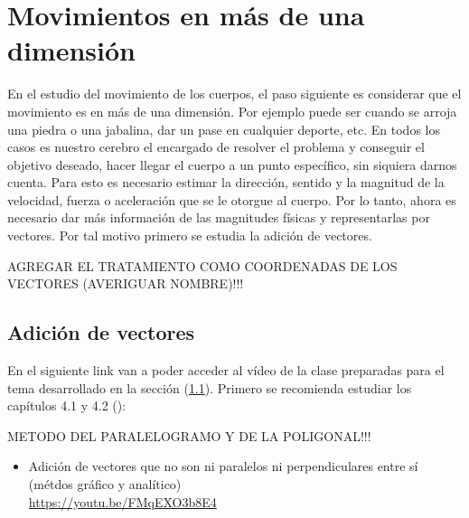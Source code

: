 
\section{Movimientos en más de una dimensión}
\label{c.2d}

En el estudio del movimiento de los cuerpos, el paso siguiente es considerar que
el movimiento es en más de una dimensión. Por ejemplo puede ser cuando se arroja
una piedra o una jabalina, dar un pase en cualquier deporte, etc. En todos los
casos es nuestro cerebro el encargado de resolver el problema y conseguir el
objetivo deseado, hacer llegar el cuerpo a un punto específico, sin siquiera
darnos cuenta. Para esto es necesario estimar la dirección, sentido y la
magnitud de la velocidad, fuerza o aceleración que se le otorgue al cuerpo. Por
lo tanto, ahora es necesario dar más información de las magnitudes físicas y
representarlas por vectores. Por tal motivo primero se estudia la adición de
vectores.

AGREGAR EL TRATAMIENTO COMO COORDENADAS DE LOS VECTORES (AVERIGUAR NOMBRE)!!!

\subsection{Adición de vectores}
\label{c.sv}

En el siguiente link van a poder acceder al vídeo de la clase
preparadas para el tema desarrollado en la sección (\ref{c.sv}). Primero se
recomienda estudiar los capítulos 4.1 y 4.2 (\citeauthor{alvarenga}):

METODO DEL PARALELOGRAMO Y DE LA POLIGONAL!!!

\begin{itemize}
  \item Adición de vectores que no son ni paralelos ni perpendiculares entre sí
  (métdos gráfico y analítico)\\
    \href{https://youtu.be/FMqEXO3b8E4}{https://youtu.be/FMqEXO3b8E4}
\end{itemize}



